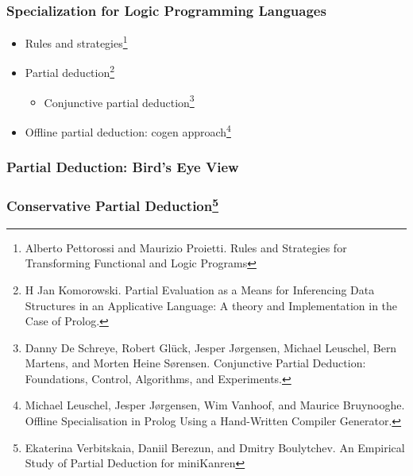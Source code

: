 \documentclass[xcolor={dvipsnames}, aspectratio=169]{beamer}
\begin{document}
\begin{frame}[fragile]
  \frametitle{Specialization for Logic Programming Languages}
\begin{itemize}
  \item Rules and strategies\footnote{Alberto Pettorossi and Maurizio Proietti. Rules and Strategies for Transforming Functional and Logic
  Programs}
  \item Partial deduction\footnote{H Jan Komorowski. Partial Evaluation as a Means for Inferencing Data Structures in an Applicative Language: A theory and Implementation in the Case of Prolog.}
  \begin{itemize}
    \item Conjunctive partial deduction\footnote{Danny De Schreye, Robert Glück, Jesper Jørgensen, Michael Leuschel, Bern Martens, and Morten Heine Sørensen. Conjunctive Partial Deduction: Foundations, Control, Algorithms, and Experiments. }
  \end{itemize}
  \item Offline partial deduction: cogen approach\footnote{Michael Leuschel, Jesper Jørgensen, Wim Vanhoof, and Maurice Bruynooghe. Offline Specialisation in Prolog Using a Hand-Written Compiler Generator.}
\end{itemize}
\end{frame}

\begin{frame}[fragile]
  \frametitle{Partial Deduction: Bird's Eye View}

\end{frame}

\begin{frame}[fragile]
  \frametitle{Conservative Partial Deduction\footnote{Ekaterina Verbitskaia, Daniil Berezun, and Dmitry Boulytchev. An Empirical Study of Partial Deduction
  for miniKanren}}
  \begin{center}
  \end{center}
\end{frame}
\end{document}

